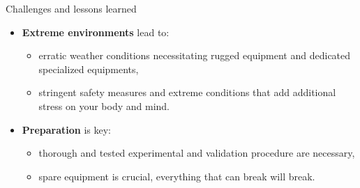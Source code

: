 \documentclass[final,hyperref={pdfpagelabels=false}]{beamer}
\begin{document}
\begin{frame}[t]
\begin{columns}[t]
\begin{column}{.465\textwidth}
\begin{block}{Challenges and lessons learned}
	\begin{itemize}
		\item \textbf{Extreme environments} lead to:
		\begin{itemize}
			\item erratic weather conditions necessitating rugged equipment and dedicated specialized equipments,
			\item stringent safety measures and extreme conditions that add additional stress on your body and mind.
		\end{itemize}
		\item \textbf{Preparation} is key:
		\begin{itemize}
			\item thorough and tested experimental and validation procedure are necessary,
			\item spare equipment is crucial, everything that can break will break.
		\end{itemize}
	\end{itemize}
\end{block}



\end{column}
\end{columns}
\end{frame}
\end{document}
